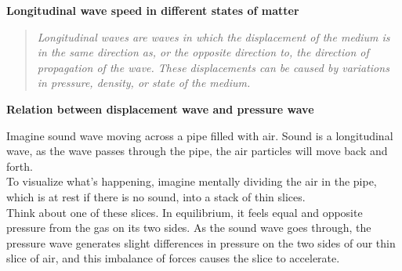 \item \textbf{Longitudinal wave speed in different states of matter}
    \begin{center}
        \begin{quote}
        \textit{Longitudinal waves are waves in which the displacement of the medium is in the same direction as, or the opposite direction to, the direction of propagation of the wave. These displacements can be caused by variations in pressure, density, or state of the medium.}
        \end{quote}
    \end{center}

    \item \textbf{Relation between displacement wave and pressure wave}
    \begin{center}
    \end{center}
    Imagine sound wave moving across a pipe filled with air. Sound is a longitudinal wave, as the wave passes through the pipe, the air particles will move back and forth. \\[2mm]
    To visualize what's happening, imagine mentally dividing the air in the pipe, which is at rest if there is no sound, into a stack of thin slices. \\[2mm]
    Think about one of these slices. In equilibrium, it feels equal and opposite pressure from the gas on its two sides. As the sound wave goes through, the pressure wave generates slight differences in pressure on the two sides of our thin slice of air, and this imbalance of forces causes the slice to accelerate.\\
    
